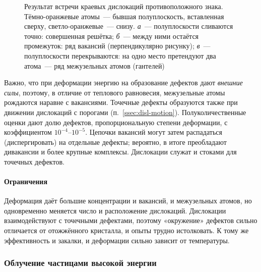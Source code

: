 \begin{figure}[ht]
\centering
{}
\caption{Результат встречи краевых дислокаций противоположного знака.
Тёмно-оранжевые атомы~— бывшая полуплоскость, вставленная сверху,
светло-оранжевые~— снизу. \textit{а}~— полуплоскости сливаются точно:
совершенная решётка; \textit{б}~— между ними остаётся промежуток: ряд
вакансий (перпендикулярно рисунку); \textit{в}~— полуплоскости
перекрываются: на одно место претендуют два атома~— ряд межузельных
атомов (гантелей)}
\label{fig:annih}
\end{figure}

Важно, что при деформации энергию на образование дефектов дают
\emph{внешние силы}, поэтому, в отличие от теплового равновесия,
межузельные атомы рождаются наравне с вакансиями. Точечные дефекты
образуются также при движении дислокаций с порогами
(п.~\ref{ssec:disl-motion}). Полуколичественные оценки дают долю
дефектов, пропорциональную степени деформации, с коэффициентом
$10^{-4}$--$10^{-5}$. Цепочки вакансий могут затем распадаться
(диспергировать) на отдельные дефекты; вероятно, в итоге преобладают
дивакансии и более крупные комплексы. Дислокации служат и стоками для
точечных дефектов.

\paragraph{Ограничения}
Деформация даёт большие концентрации и вакансий, и межузельных атомов,
но одновременно меняется число и расположение дислокаций. Дислокации
взаимодействуют с точечными дефектами, поэтому «окружение» дефектов
сильно отличается от отожжённого кристалла, и опыты трудно истолковать.
К тому же эффективность и закалки, и деформации сильно зависит от
температуры.

\subsubsection{Облучение частицами высокой энергии}

